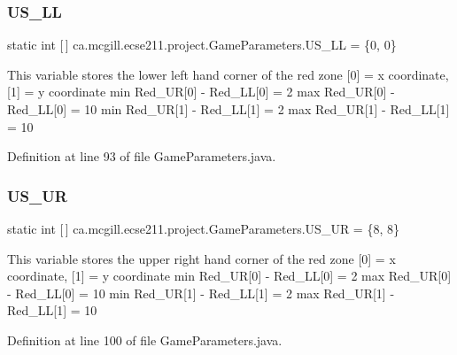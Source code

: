 \subsubsection{\texorpdfstring{U\+S\+\_\+\+LL}{US\_LL}}
{\footnotesize\ttfamily  static  int \mbox{[}$\,$\mbox{]} ca.\+mcgill.\+ecse211.\+project.\+Game\+Parameters.\+U\+S\+\_\+\+LL = \{0, 0\}\hspace{0.3cm}{\ttfamily [static]}}

This variable stores the lower left hand corner of the red zone \mbox{[}0\mbox{]} = x coordinate, \mbox{[}1\mbox{]} = y coordinate min Red\+\_\+\+UR\mbox{[}0\mbox{]} -\/ Red\+\_\+\+LL\mbox{[}0\mbox{]} = 2 max Red\+\_\+\+UR\mbox{[}0\mbox{]} -\/ Red\+\_\+\+LL\mbox{[}0\mbox{]} = 10 min Red\+\_\+\+UR\mbox{[}1\mbox{]} -\/ Red\+\_\+\+LL\mbox{[}1\mbox{]} = 2 max Red\+\_\+\+UR\mbox{[}1\mbox{]} -\/ Red\+\_\+\+LL\mbox{[}1\mbox{]} = 10 

Definition at line 93 of file Game\+Parameters.\+java.

\mbox{\label{enumca_1_1mcgill_1_1ecse211_1_1project_1_1_game_parameters_ab53ad7cced40d028fd0bbc3472cd2f8d}} 
\subsubsection{\texorpdfstring{U\+S\+\_\+\+UR}{US\_UR}}
{\footnotesize\ttfamily  static  int \mbox{[}$\,$\mbox{]} ca.\+mcgill.\+ecse211.\+project.\+Game\+Parameters.\+U\+S\+\_\+\+UR = \{8, 8\}\hspace{0.3cm}{\ttfamily [static]}}

This variable stores the upper right hand corner of the red zone \mbox{[}0\mbox{]} = x coordinate, \mbox{[}1\mbox{]} = y coordinate min Red\+\_\+\+UR\mbox{[}0\mbox{]} -\/ Red\+\_\+\+LL\mbox{[}0\mbox{]} = 2 max Red\+\_\+\+UR\mbox{[}0\mbox{]} -\/ Red\+\_\+\+LL\mbox{[}0\mbox{]} = 10 min Red\+\_\+\+UR\mbox{[}1\mbox{]} -\/ Red\+\_\+\+LL\mbox{[}1\mbox{]} = 2 max Red\+\_\+\+UR\mbox{[}1\mbox{]} -\/ Red\+\_\+\+LL\mbox{[}1\mbox{]} = 10 

Definition at line 100 of file Game\+Parameters.\+java.

